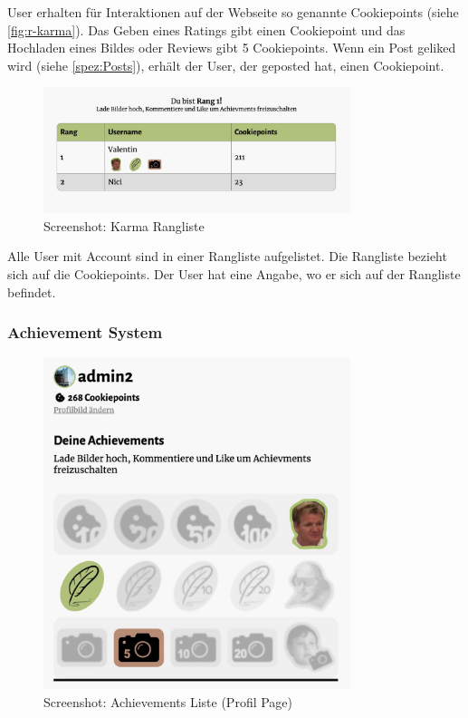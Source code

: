 User erhalten für Interaktionen auf der Webseite so genannte Cookiepoints (siehe
\ref{fig:r-karma}). Das Geben eines Ratings gibt einen Cookiepoint und das
Hochladen eines Bildes oder Reviews gibt 5 Cookiepoints. Wenn ein Post geliked
wird (siehe \ref{spez:Posts}), erhält der User, der geposted hat, einen
Cookiepoint. 

\begin{figure}[ht]
    \centering
    \includegraphics[width=0.8\textwidth]{images/Resultat_Rangliste.png}
    \caption{Screenshot: Karma Rangliste}
    \label{fig:r-rangliste}
\end{figure} 

Alle User mit Account sind in einer Rangliste aufgelistet. Die Rangliste bezieht
sich auf die Cookiepoints. Der User hat eine Angabe, wo er sich auf der
Rangliste befindet.

\subsubsection*{Achievement System}

\begin{figure}[ht]
    \centering
    \includegraphics[width=0.8\textwidth]{images/Resultate_Achievements.png}
    \caption{Screenshot: Achievements Liste (Profil Page)}
    \label{fig:r-Achievement}
\end{figure} 

